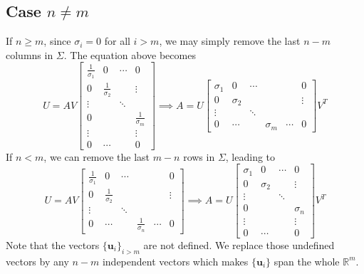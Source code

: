 \subsection{Case $n \neq m$}

If $n \geq m$, since $\sigma_i = 0$ for all $i >m$,  we may simply remove the last $n-m$ columns in $\Sigma$. The equation above becomes
\[
	U = AV
	\begin{bmatrix}
		\frac{1}{\sigma_1} &0 &\cdots &0 \\
		0 &\frac{1}{\sigma_2} & & \vdots \\
		\vdots & &\ddots \\
		0 & & &\frac{1}{\sigma_m} \\
		\vdots & & & \vdots\\
		0 &\cdots & &0
	\end{bmatrix}
	\implies A = U 
	\begin{bmatrix}
		\sigma_1 &0 &\cdots & & &0 \\
		0 &\sigma_2 & & & &\vdots \\
		\vdots & &\ddots \\
		0 &\cdots & &\sigma_m &\cdots &0
	\end{bmatrix}
	V^T
\]
If $n < m$, we can remove the last $m-n$ rows in $\Sigma$, leading to
\[
	U = AV
	\begin{bmatrix}
		\frac{1}{\sigma_1} &0 &\cdots & & &0 \\
		0 &\frac{1}{\sigma_2} & & & &\vdots \\
		\vdots & &\ddots \\
		0 &\cdots & &\frac{1}{\sigma_n} &\cdots &0
	\end{bmatrix}
	\implies A = U
	\begin{bmatrix}
		\sigma_1 &0 &\cdots &0 \\
		0 &\sigma_2 & & \vdots \\
		\vdots & &\ddots \\
		0 & & &\sigma_n \\
		\vdots & & & \vdots\\
		0 &\cdots & &0
	\end{bmatrix}
	 V^T
\]
Note that the vectors $\{\mathbf{u}_i\}_{i > m}$ are not defined. We replace those undefined vectors by any $n-m$ independent vectors which makes $\{\mathbf{u}_i\}$ span the whole $\mathbb{R}^m$.

\pagebreak

\nocite{*}
\printbibliography


